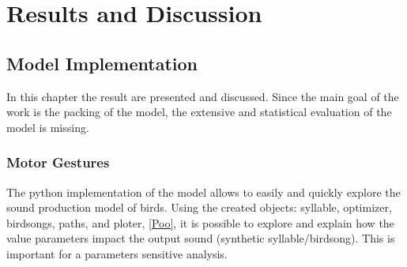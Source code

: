 \chapter{Results and Discussion}\label{chap_results}

\section{Model Implementation}

In this chapter the result are presented and discussed. Since the main goal of the work is the packing of the model, the extensive and statistical evaluation of the model is missing.

\subsection{Motor Gestures}

The python implementation of the model allows to easily and quickly explore the sound production model of birds. Using the created objects: syllable, optimizer, birdsongs, paths, and ploter, \ref{Poo}, it is possible to explore and explain how the value parameters impact the output sound (synthetic syllable/birdsong). This is important for a parameters sensitive analysis. 

